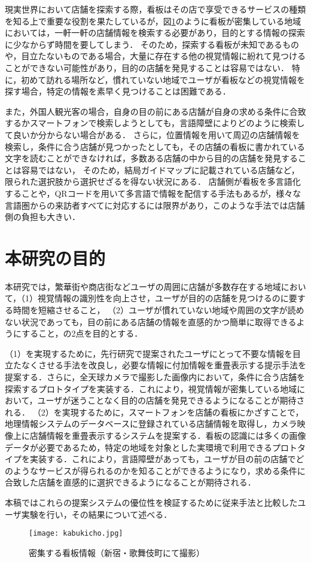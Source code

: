   現実世界において店舗を探索する際，看板はその店で享受できるサービスの種類を知る上で重要な役割を果たしているが，図\ref{figure:kabukicho}のように看板が密集している地域においては，一軒一軒の店舗情報を検索する必要があり，目的とする情報の探索に少なからず時間を要してしまう．
  そのため，探索する看板が未知であるものや，目立たないものである場合，大量に存在する他の視覚情報に紛れて見つけることができない可能性があり，目的の店舗を発見することは容易ではない．
  特に，初めて訪れる場所など，慣れていない地域でユーザが看板などの視覚情報を探す場合，特定の情報を素早く見つけることは困難である．

  また，外国人観光客の場合，自身の目の前にある店舗が自身の求める条件に合致するかスマートフォンで検索しようとしても，言語障壁によりどのように検索して良いか分からない場合がある．
  さらに，位置情報を用いて周辺の店舗情報を検索し，条件に合う店舗が見つかったとしても，その店舗の看板に書かれている文字を読むことができなければ，多数ある店舗の中から目的の店舗を発見することは容易ではない，
  そのため，結局ガイドマップに記載されている店舗など，限られた選択肢から選択せざるを得ない状況にある．
  店舗側が看板を多言語化することや，QRコードを用いて多言語で情報を配信する手法もあるが，様々な言語圏からの来訪者すべてに対応するには限界があり，このような手法では店舗側の負担も大きい．

\section{本研究の目的}
\label{section:purpose}
  本研究では，繁華街や商店街などユーザの周囲に店舗が多数存在する地域において，（1）視覚情報の識別性を向上させ，ユーザが目的の店舗を見つけるのに要する時間を短縮させること，
  （2）ユーザが慣れていない地域や周囲の文字が読めない状況であっても，目の前にある店舗の情報を直感的かつ簡単に取得できるようにすること，の2点を目的とする．

  （1）を実現するために，先行研究\cite{Fujita:2013}で提案されたユーザにとって不要な情報を目立たなくさせる手法を改良し，必要な情報に付加情報を重畳表示する提示手法を提案する．さらに，全天球カメラで撮影した画像内において，条件に合う店舗を探索するプロトタイプを実装する．これにより，視覚情報が密集している地域において，ユーザが迷うことなく目的の店舗を発見できるようになることが期待される．
  （2）を実現するために，スマートフォンを店舗の看板にかざすことで，地理情報システムのデータベースに登録されている店舗情報を取得し，カメラ映像上に店舗情報を重畳表示するシステムを提案する．看板の認識には多くの画像データが必要であるため，特定の地域を対象とした実環境で利用できるプロトタイプを実装する．これにより，言語障壁があっても，ユーザが目の前の店舗でどのようなサービスが得られるのかを知ることができるようになり，求める条件に合致した店舗を直感的に選択できるようになることが期待される．

  本稿ではこれらの提案システムの優位性を検証するために従来手法と比較したユーザ実験を行い，その結果について述べる．

  \begin{figure}[tb]
    \centerline{\texttt{[image: kabukicho.jpg]}}
    \caption{密集する看板情報（新宿・歌舞伎町にて撮影）}
    \label{figure:kabukicho}
  \end{figure}
